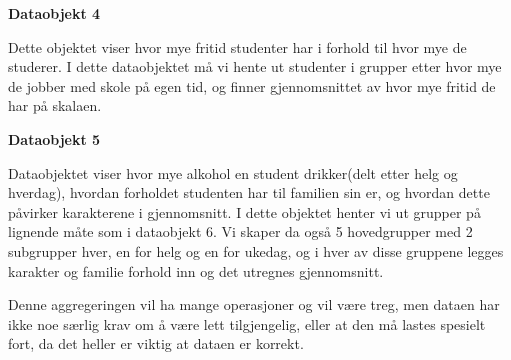 \textbf{Dataobjekt 4}


Dette objektet viser hvor mye fritid studenter har i forhold til hvor mye de studerer. I dette dataobjektet må vi hente ut studenter i grupper etter hvor mye de jobber med skole på egen tid, og finner gjennomsnittet av hvor mye fritid de har på skalaen.

\textbf{Dataobjekt 5}


Dataobjektet viser hvor mye alkohol en student drikker(delt etter helg og hverdag), hvordan forholdet studenten har til familien sin er, og hvordan dette påvirker karakterene i gjennomsnitt. I dette objektet henter vi ut grupper på lignende måte som i dataobjekt 6. Vi skaper da også 5 hovedgrupper med 2 subgrupper hver, en for helg og en for ukedag, og i hver av disse gruppene legges karakter og familie forhold inn og det utregnes gjennomsnitt. 

Denne aggregeringen vil ha mange operasjoner og vil være treg, men dataen har ikke noe særlig krav om å være lett tilgjengelig, eller at den må lastes spesielt fort, da det heller er viktig at dataen er korrekt.